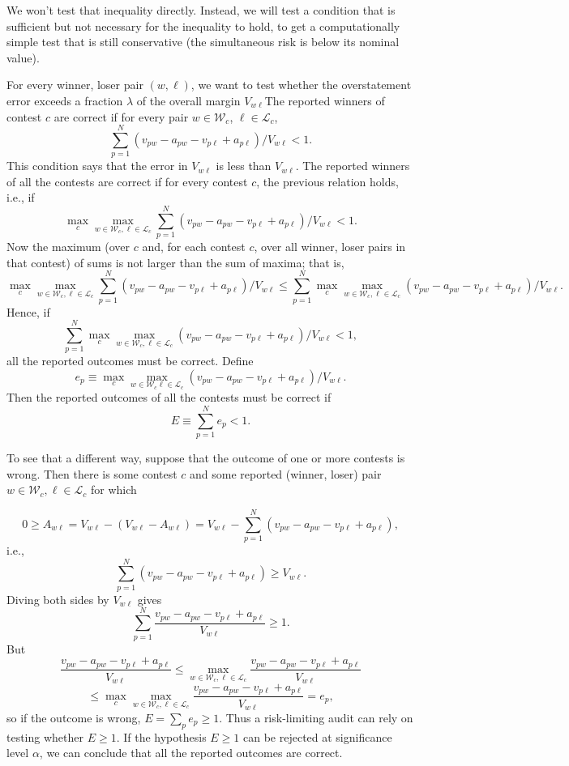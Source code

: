 We won't test that inequality directly.
Instead, we will test a condition that is sufficient but not necessary for the
inequality to hold, to get a computationally simple test that
is still conservative (the simultaneous risk is below its nominal value).

For every winner, loser pair $(w, \ell)$, we want to test
whether the overstatement error exceeds a fraction $\lambda$ of the overall margin 
$V_{w\ell}$The reported winners of contest $c$ are correct if for every pair $w \in \mathcal{W}_c$,
$\ell \in \mathcal{L}_c$,
$$
   \sum_{p=1}^N (v_{pw}-a_{pw} - v_{p\ell} + a_{p\ell})/V_{w\ell} < 1.
$$
This condition says that the error in $V_{w\ell}$ is less than $V_{w\ell}$.
The reported winners of all the contests are correct if for every contest $c$,
the previous relation holds, i.e., if
$$
   \max_c \max_{w \in \mathcal{W}_c,  \ell \in \mathcal{L}_c}
   \sum_{p=1}^N (v_{pw}-a_{pw} - v_{p\ell} + a_{p\ell})/V_{w\ell} < 1.
$$
Now the maximum (over $c$ and, for each contest $c$, over all winner, loser pairs in
that contest) of sums
is not larger than the sum of maxima; that is,
$$
\max_c \max_{w \in \mathcal{W}_c,  \ell \in \mathcal{L}_c}
   \sum_{p=1}^N (v_{pw}-a_{pw} - v_{p\ell} + a_{p\ell})/V_{w\ell}
   \le
  \sum_{p=1}^N  \max_c \max_{w \in \mathcal{W}_c,  \ell \in \mathcal{L}_c} 
  (v_{pw}-a_{pw} - v_{p\ell} + a_{p\ell})/V_{w\ell}.
$$
Hence, if 
$$
\sum_{p=1}^N  \max_c \max_{w \in \mathcal{W}_c,  \ell \in \mathcal{L}_c} 
  (v_{pw}-a_{pw} - v_{p\ell} + a_{p\ell})/V_{w\ell} < 1,
$$
all the reported outcomes must be correct.
Define 
$$
  e_p \equiv \max_c \max_{w \in \mathcal{W}_c \ell \in \mathcal{L}_c} (v_{pw}-a_{pw} - v_{p\ell} + a_{p\ell})/V_{w\ell}.
$$
Then the reported outcomes of all the contests must be correct if 
$$ 
  E \equiv \sum_{p=1}^N e_p < 1.
$$

To see that a different way, suppose that the outcome of one or more contests is wrong.
Then there is some contest $c$ and some reported (winner, loser) pair
$w \in \mathcal{W}_c, \ell \in \mathcal{L}_c$ for which

$$ 
   0 \ge A_{w\ell} = V_{w\ell} - (V_{w\ell} - A_{w\ell}) =
   V_{w\ell} - \sum_{p=1}^N (v_{pw} - a_{pw} - v_{p\ell} + a_{p\ell}),
$$
i.e.,
$$ 
\sum_{p=1}^N (v_{pw} - a_{pw} - v_{p\ell} + a_{p\ell}) \ge V_{w\ell}.
$$
Diving both sides by $V_{w\ell}$ gives
$$
\sum_{p=1}^N \frac{v_{pw} - a_{pw} - v_{p\ell} + a_{p\ell}}{V_{w\ell}} \ge 1.
$$
But
$$
\frac{v_{pw} - a_{pw} - v_{p\ell} + a_{p\ell}}{V_{w\ell}}
\le 
\max_{w \in \mathcal{W}_c, \ell \in \mathcal{L}_c} \frac{v_{pw}-a_{pw} - v_{p\ell} + a_{p\ell}}{V_{w\ell}}
$$
$$
\le 
\max_c \max_{w \in \mathcal{W}_c, \ell \in \mathcal{L}_c} \frac{v_{pw}-a_{pw} - v_{p\ell} + a_{p\ell}}{V_{w\ell}}
= e_p,
$$
so if the outcome is wrong, $E = \sum_p e_p \ge 1$.
Thus a risk-limiting audit can rely on testing whether $E \ge 1$.
If the hypothesis $E \ge 1$ can be rejected at significance level $\alpha$,
we can conclude that all the reported outcomes are correct.

